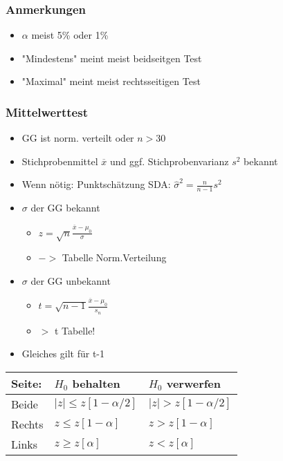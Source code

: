 \documentclass[a4paper]{article}
\begin{document}
\begin{landscape}
\begin{multicols}{4}
        \subsubsection*{Anmerkungen}
        \begin{itemize}[noitemsep,nolistsep,leftmargin=*]
            \item $\alpha$ meist 5\% oder 1\%
            \item "Mindestens" meint meist beidseitgen Test
            \item "Maximal" meint meist rechtsseitigen Test
        \end{itemize}
        \subsubsection*{Mittelwerttest}
        \begin{itemize}[noitemsep,nolistsep,leftmargin=*]
            \item GG ist norm. verteilt oder $n > 30$
            \item Stichprobenmittel $\overline{x}$ und ggf. Stichprobenvarianz $s^2$ bekannt
            \item Wenn nötig: Punktschätzung SDA: $\hat{\sigma}^2 = \frac{n}{n-1}s^2$
            \item $\sigma$ der GG bekannt
            \begin{itemize}[noitemsep,nolistsep,leftmargin=*]
                \item $z = \sqrt{n}\frac{\overline{x}-\mu_0}{\sigma}$
                \item $->$ Tabelle Norm.Verteilung
            \end{itemize}
            \item $\sigma$ der GG unbekannt
            \begin{itemize}[noitemsep,nolistsep,leftmargin=*]
                \item $t = \sqrt{n-1}\frac{\overline{x}-\mu_0}{s_n}$
                \item $>$ t Tabelle!
            \end{itemize}
            \item Gleiches gilt für t-1
        \end{itemize}
        \begin{center}
            \begin{tabular}{|l|l|l|}
             Seite:& $H_0$ behalten & $H_0$ verwerfen  \\ \hline
             Beide & $|z|  \leq z[1-\alpha/2]$  & $|z| > z[1-\alpha/2]$  \\ \hline
             Rechts& $z  \leq z[1-\alpha]$ &  $z > z[1-\alpha]$ \\ \hline
             Links & $z  \geq z[\alpha]$  &  $z < z[\alpha]$ \\ \hline
            \end{tabular}
        \end{center}





\end{multicols}
\end{landscape}
\end{document}
